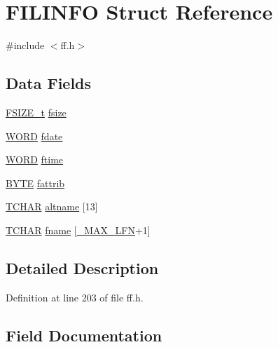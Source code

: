 \hypertarget{structFILINFO}{}\section{F\+I\+L\+I\+N\+FO Struct Reference}
\label{structFILINFO}


{\ttfamily \#include $<$ff.\+h$>$}

\subsection*{Data Fields}
\begin{DoxyCompactItemize}
\item 
\hyperlink{ff_8h_a3fc0992ad7436250b6b1a0592214b7f2}{F\+S\+I\+Z\+E\+\_\+t} \hyperlink{structFILINFO_a9e5b78ed7190f73de3ebcbdfbd6d1844}{fsize}
\item 
\hyperlink{integer_8h_a197942eefa7db30960ae396d68339b97}{W\+O\+RD} \hyperlink{structFILINFO_a7c01c48a15b1b49da459924437b0bd52}{fdate}
\item 
\hyperlink{integer_8h_a197942eefa7db30960ae396d68339b97}{W\+O\+RD} \hyperlink{structFILINFO_ae0f751b79621bf7b29669f177bbe6b9a}{ftime}
\item 
\hyperlink{integer_8h_a4ae1dab0fb4b072a66584546209e7d58}{B\+Y\+TE} \hyperlink{structFILINFO_a838d542585831b085537b363f18205c0}{fattrib}
\item 
\hyperlink{ff_8h_a03bdb8ce5895c7e261aadc2529637546}{T\+C\+H\+AR} \hyperlink{structFILINFO_a37243296fadacbde8500b5668d99682e}{altname} \mbox{[}13\mbox{]}
\item 
\hyperlink{ff_8h_a03bdb8ce5895c7e261aadc2529637546}{T\+C\+H\+AR} \hyperlink{structFILINFO_a7c3ce2dd03dc9a9726967fc43116079f}{fname} \mbox{[}\hyperlink{ffconf_8h_a14e73a5c703a586c614b3e40b849f82c}{\+\_\+\+M\+A\+X\+\_\+\+L\+FN}+1\mbox{]}
\end{DoxyCompactItemize}


\subsection{Detailed Description}


Definition at line 203 of file ff.\+h.



\subsection{Field Documentation}
\mbox{\label{structFILINFO_a37243296fadacbde8500b5668d99682e}} 
